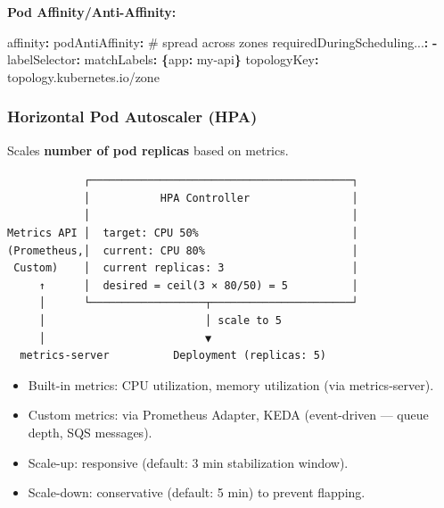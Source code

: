\documentclass[11pt]{article}
\providecommand{\tightlist}{\setlength{\itemsep}{1pt}\setlength{\parskip}{0pt}}
\newenvironment{Shaded}{\begin{snugshade}}{\end{snugshade}}
\newcommand{\AttributeTok}[1]{\textcolor[rgb]{0.16,0.50,0.73}{#1}}
\newcommand{\CommentTok}[1]{\textcolor[rgb]{0.48,0.49,0.49}{#1}}
\newcommand{\FunctionTok}[1]{\textcolor[rgb]{0.56,0.27,0.68}{#1}}
\newcommand{\KeywordTok}[1]{\textcolor[rgb]{0.81,0.81,0.76}{\textbf{#1}}}
\begin{document}
\textbf{Pod Affinity/Anti-Affinity:}


\begin{Shaded}
\begin{Highlighting}[]
\FunctionTok{affinity}\KeywordTok{:}
\AttributeTok{  }\FunctionTok{podAntiAffinity}\KeywordTok{:}\CommentTok{              \# spread across zones}
\AttributeTok{    }\FunctionTok{requiredDuringScheduling...}\KeywordTok{:}
\AttributeTok{    }\KeywordTok{{-}}\AttributeTok{ }\FunctionTok{labelSelector}\KeywordTok{:}
\AttributeTok{        }\FunctionTok{matchLabels}\KeywordTok{:}\AttributeTok{ }\KeywordTok{\{}\FunctionTok{app}\KeywordTok{:}\AttributeTok{ my{-}api}\KeywordTok{\}}
\AttributeTok{      }\FunctionTok{topologyKey}\KeywordTok{:}\AttributeTok{ topology.kubernetes.io/zone}
\end{Highlighting}
\end{Shaded}

\subsubsection{Horizontal Pod Autoscaler (HPA)}\label{horizontal-pod-autoscaler-hpa}

Scales \textbf{number of pod replicas} based on metrics.

\setcodelang{}

\begin{verbatim}
            ┌─────────────────────────────────────────┐
            │           HPA Controller                │
            │                                         │
Metrics API │  target: CPU 50%                        │
(Prometheus,│  current: CPU 80%                       │
 Custom)    │  current replicas: 3                    │
     ↑      │  desired = ceil(3 × 80/50) = 5          │
     │      └──────────────────┬──────────────────────┘
     │                         │ scale to 5
     │                         ▼
  metrics-server          Deployment (replicas: 5)
\end{verbatim}

\begin{itemize}
\tightlist
\item
  Built-in metrics: CPU utilization, memory utilization (via metrics-server).
\item
  Custom metrics: via Prometheus Adapter, KEDA (event-driven --- queue depth, SQS messages).
\item
  Scale-up: responsive (default: 3 min stabilization window).
\item
  Scale-down: conservative (default: 5 min) to prevent flapping.
\end{itemize}
\end{document}
